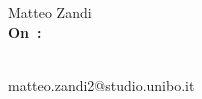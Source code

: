 \pagestyle{empty}
{\raggedleft\vspace*{\baselineskip}
{\LARGE Matteo Zandi}\\[0.35\textheight]
{\HUGE \textcolor{mycolor}{\textbf{On~\thetitle:}}}\\[\baselineskip]
{\LARGE \subt }\\[\baselineskip]
{\large \thedate}\par
\vspace*{2\baselineskip}
\vfill
{\large matteo.zandi2@studio.unibo.it}\par
\vspace*{\baselineskip}}
\clearpage
\pagestyle{headings}
